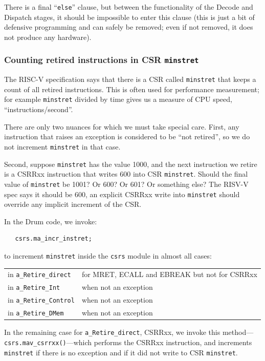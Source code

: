 There is a final ``\verb|else|'' clause, but between the functionality
of the Decode and Dispatch stages, it should be impossible to enter
this clause (this is just a bit of defensive programming and can
safely be removed; even if not removed, it does not produce any
hardware).


\subsubsection{Counting retired instructions in CSR {\tt minstret}}

The RISC-V specification says that there is a CSR called
\verb|minstret| that keeps a count of all retired instructions.  This
is often used for performance measurement; for example \verb|minstret|
divided by time gives us a measure of CPU speed,
``instructions/second''.

There are only two nuances for which we must take special care.
First, any instruction that raises an exception is considered to be
``not retired'', so we do not increment \verb|minstret| in that case.

Second, suppose \verb|minstret| has the value 1000, and the next
instruction we retire is a CSRRxx instruction that writes 600 into CSR
\verb|minstret|.  Should the final value of \verb|minstret| be 1001?
Or 600? Or 601? Or something else?  The RISV-V spec says it should be
600, {\ie} an explicit CSRRxx write into \verb|minstret| should
override any implicit increment of the CSR.

In the Drum code, we invoke:

{\footnotesize
\begin{Verbatim}
   csrs.ma_incr_instret;
\end{Verbatim}
}

to increment \verb|minstret| inside the \verb|csrs| module in almost
all cases:

\hmm
\begin{tabular}{ll}
 in {\tt a\_Retire\_direct}   & for MRET, ECALL and EBREAK but not for CSRRxx \\
 in {\tt a\_Retire\_Int}      & when not an exception \\
 in {\tt a\_Retire\_Control}  & when not an exception \\
 in {\tt a\_Retire\_DMem}     & when not an exception
\end{tabular}

In the remaining case for {\tt a\_Retire\_direct}, CSRRxx, we invoke
this method---{\tt csrs.mav\_csrrxx()}---which performs the CSRRxx
instruction, and increments \verb|minstret| if there is no exception
and if it did not write to CSR \verb|minstret|.

